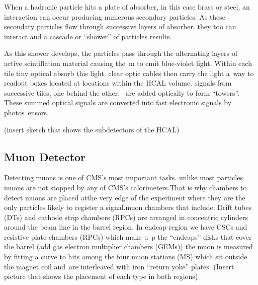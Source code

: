 When a hadronic particle hits a plate of absorber, in this case brass or steel, an interaction can occur producing numerous secondary particles. As these secondary particles flow through successive layers of absorber. they too can interact and a cascade or “shower” of particles results.

As this shower develops, the particles pass through the alternating layers of active scintillation material causing the\
m to emit blue-violet light. Within each tile tiny optical absorb this light. clear optic cables then carry the light a\
way to readout boxes located at locations within the HCAL volume. signals from successive tiles, one behind the other, \
are added optically to form “towers”. These summed optical signals are converted into fast electronic signals by photos\
ensors.

(insert sketch that shows the subdetectors of the HCAL)

\subsection{Muon Detector}
Detecting muons is one of CMS’s most important tasks. unlike most particles muons are not stopped by any of CMS’s calorimeters.That is why chambers to detect muons are placed atthe very edge of the experiment where they are the only particles likely to register a signal.muon chambers that include: Drift tubes (DTs) and cathode strip chambers (RPCs) are arranged in concentric cylinders around the beam line in the barrel region. In endcap region we have CSCs and resistive plate chambers (RPCs) which make u\
p the “endcaps” disks that cover the barrel (add gas electron multiplier chambers (GEMs))
the muon is measured by fitting a curve to hits among the four muon stations (MS) which sit outside the magnet coil and\
 are interleaved with iron “return yoke” plates.
 (Insert picture that shows the placement of each type in both regions)

 


